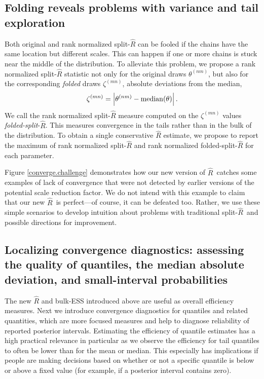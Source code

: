 \documentclass[american,]{article}
\newcommand{\Rhat}{$\widehat{R}$}
\newcommand{\sRhat}{split-$\widehat{R}$}
\theoremstyle{definition}
\begin{document}
\hypertarget{diagnostics-for-folded-draws}{%
\subsection{Folding reveals problems with variance and tail exploration}\label{diagnostics-for-folded-draws}}


Both original and rank normalized split-\(\widehat{R}\) can be
fooled if the chains have the same location but different scales. This
can happen if one or more chains is stuck near the middle of the distribution. 
To alleviate this problem, we propose a
rank normalized split-\(\widehat{R}\) statistic not only for the
original draws \(\theta^{(nm)}\), but also for the corresponding {\em folded}
draws \(\zeta^{(mn)}\), absolute deviations from the median,
\begin{equation}
\label{zeta}
\zeta^{(mn)} = \left|\theta^{(nm)}-{\rm median}(\theta)\right|.
\end{equation}
We call the rank normalized split-\(\widehat{R}\) measure computed on the
 \(\zeta^{(mn)}\) values  \emph{folded-split}-\(\widehat{R}\).
  This measures convergence in the
tails rather than in the bulk of the distribution. To obtain a single
conservative \(\widehat{R}\) estimate, we propose to report the maximum
of rank normalized split-\(\widehat{R}\) and rank normalized
folded-split-\(\widehat{R}\) for each parameter.

Figure \ref{converge.challenge} demonstrates how our new version  of \Rhat\  catches some examples of lack of convergence that were not detected by earlier versions of the potential scale reduction factor. We do not intend with this example to claim that our new \Rhat\ is perfect---of course, it can be defeated too.  Rather, we use these simple scenarios to develop intuition about problems with  traditional  \sRhat\  and possible directions for improvement.

\hypertarget{convergence-diagnostics-for-quantiles}{%
\subsection{Localizing convergence diagnostics: assessing the quality of quantiles, the median absolute deviation, and small-interval probabilities }\label{convergence-diagnostics-for-quantiles}}

The new \(\widehat{R}\) and bulk-ESS introduced above are useful as overall efficiency
measures. Next we introduce
convergence diagnostics for quantiles and related quantities, which are more focused measures and help to diagnose reliability of  reported
posterior intervals. Estimating
the efficiency of quantile estimates has a high practical
relevance in particular as we observe the efficiency for tail quantiles
to often be lower than for the mean or median.  This especially has implications
if people are making decisions based on whether or not a specific quantile
is below or above a fixed value (for example, if a posterior interval contains zero).
\end{document}
